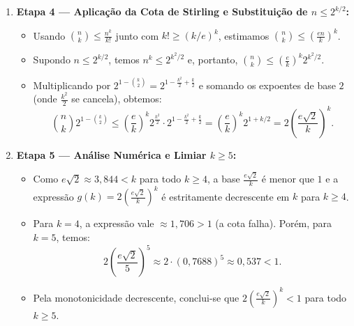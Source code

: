 \documentclass[11pt, a4paper]{article}
\begin{document}
\begin{enumerate}
    \item \textbf{Etapa 4 --- Aplicação da Cota de Stirling e Substituição de $n \le 2^{k/2}$:}
    \begin{itemize}
        \item Usando $\binom{n}{k} \le \frac{n^k}{k!}$ junto com $k! \ge (k/e)^k$, estimamos $\binom{n}{k} \le \left(\frac{en}{k}\right)^k$.
        \item Supondo $n \le 2^{k/2}$, temos $n^k \le 2^{k^2/2}$ e, portanto, $\binom{n}{k} \le \left(\frac{e}{k}\right)^k 2^{k^2/2}$.
        \item Multiplicando por $2^{1 - \binom{k}{2}} = 2^{1 - \frac{k^2}{2} + \frac{k}{2}}$ e somando os expoentes de base $2$ (onde $\frac{k^2}{2}$ se cancela), obtemos:
        \[ \binom{n}{k} 2^{1 - \binom{k}{2}} \le \left(\frac{e}{k}\right)^k 2^{\frac{k^2}{2}} \cdot 2^{1 - \frac{k^2}{2} + \frac{k}{2}} = \left(\frac{e}{k}\right)^k 2^{1 + k/2} = 2\left(\frac{e\sqrt{2}}{k}\right)^k. \]
    \end{itemize}

    \item \textbf{Etapa 5 --- Análise Numérica e Limiar $k \ge 5$:}
    \begin{itemize}
        \item Como $e\sqrt{2} \approx 3{,}844 < k$ para todo $k \ge 4$, a base $\frac{e\sqrt{2}}{k}$ é menor que $1$ e a expressão $g(k) = 2\left(\frac{e\sqrt{2}}{k}\right)^k$ é estritamente decrescente em $k$ para $k \ge 4$.
        \item Para $k = 4$, a expressão vale $\approx 1{,}706 > 1$ (a cota falha). Porém, para $k = 5$, temos:
        \[ 2\left(\frac{e\sqrt{2}}{5}\right)^5 \approx 2 \cdot (0{,}7688)^5 \approx 0{,}537 < 1. \]
        \item Pela monotonicidade decrescente, conclui-se que $2\left(\frac{e\sqrt{2}}{k}\right)^k < 1$ para todo $k \ge 5$.
    \end{itemize}


\end{enumerate}
\end{document}
